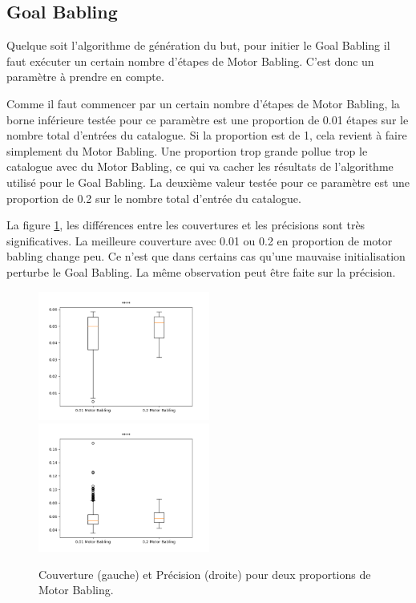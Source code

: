 \documentclass[11pt,french]{report}
\begin{document}
\subsection{Goal Babling}

Quelque soit l'algorithme de génération du but, pour initier le Goal Babling il faut exécuter un certain nombre d'étapes de Motor Babling.
C'est donc un paramètre à prendre en compte.

Comme il faut commencer par un certain nombre d'étapes de Motor Babling, la borne inférieure testée pour ce paramètre est une proportion de 0.01 étapes sur le nombre total d'entrées du catalogue.
Si la proportion est de 1, cela revient à faire simplement du Motor Babling. Une proportion trop grande pollue trop le catalogue avec du Motor Babling, ce qui va cacher les résultats de l'algorithme utilisé pour le Goal Babling.
La deuxième valeur testée pour ce paramètre est une proportion de 0.2 sur le nombre total d'entrée du catalogue.

La figure \ref{fig:effet_mb_prop}, les différences entre les couvertures et les précisions sont très significatives.
La meilleure couverture avec 0.01 ou 0.2 en proportion de motor babling change peu.
Ce n'est que dans certains cas qu'une mauvaise initialisation perturbe le Goal Babling.
La même observation peut être faite sur la précision.

\begin{figure}[h]
    \centering
    \includegraphics[width=160pt]{0.2-.01mb_couver.png} \includegraphics[width=160pt]{0.2-.01mb_moy_gl.png}
    \caption{Couverture (gauche) et Précision (droite) pour deux proportions de Motor Babling.}
    \label{fig:effet_mb_prop}
\end{figure}
\end{document}
